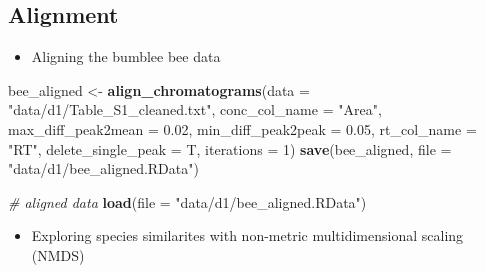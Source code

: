 \documentclass[]{article}
\newenvironment{Shaded}{}{}
\newcommand{\KeywordTok}[1]{\textbf{{#1}}}
\newcommand{\DataTypeTok}[1]{\textcolor[rgb]{0.50,0.00,0.00}{{#1}}}
\newcommand{\DecValTok}[1]{\textcolor[rgb]{0.00,0.00,1.00}{{#1}}}
\newcommand{\FloatTok}[1]{\textcolor[rgb]{0.50,0.00,0.50}{{#1}}}
\newcommand{\StringTok}[1]{\textcolor[rgb]{0.87,0.00,0.00}{{#1}}}
\newcommand{\CommentTok}[1]{\textcolor[rgb]{0.50,0.50,0.50}{\textit{{#1}}}}
\newcommand{\NormalTok}[1]{{#1}}
\providecommand{\tightlist}{%
  \setlength{\itemsep}{0pt}\setlength{\parskip}{0pt}}
\begin{document}
\subsection{Alignment}\label{alignment}

\begin{itemize}
\tightlist
\item
  Aligning the bumblee bee data
\end{itemize}

\begin{Shaded}
\begin{Highlighting}[]
\NormalTok{bee_aligned <-}\StringTok{ }\KeywordTok{align_chromatograms}\NormalTok{(}\DataTypeTok{data =} \StringTok{"data/d1/Table_S1_cleaned.txt"}\NormalTok{,}
                    \DataTypeTok{conc_col_name =} \StringTok{"Area"}\NormalTok{,}
                    \DataTypeTok{max_diff_peak2mean =} \FloatTok{0.02}\NormalTok{,}
                    \DataTypeTok{min_diff_peak2peak =} \FloatTok{0.05}\NormalTok{,}
                    \DataTypeTok{rt_col_name =} \StringTok{"RT"}\NormalTok{,}
                    \DataTypeTok{delete_single_peak =} \NormalTok{T,}
                    \DataTypeTok{iterations =} \DecValTok{1}\NormalTok{)}
\KeywordTok{save}\NormalTok{(bee_aligned, }\DataTypeTok{file =} \StringTok{"data/d1/bee_aligned.RData"}\NormalTok{)}
\end{Highlighting}
\end{Shaded}

\begin{Shaded}
\begin{Highlighting}[]
\CommentTok{# aligned data}
\KeywordTok{load}\NormalTok{(}\DataTypeTok{file =} \StringTok{"data/d1/bee_aligned.RData"}\NormalTok{)}
\end{Highlighting}
\end{Shaded}

\begin{itemize}
\tightlist
\item
  Exploring species similarites with non-metric multidimensional scaling
  (NMDS)
\end{itemize}
\end{document}

